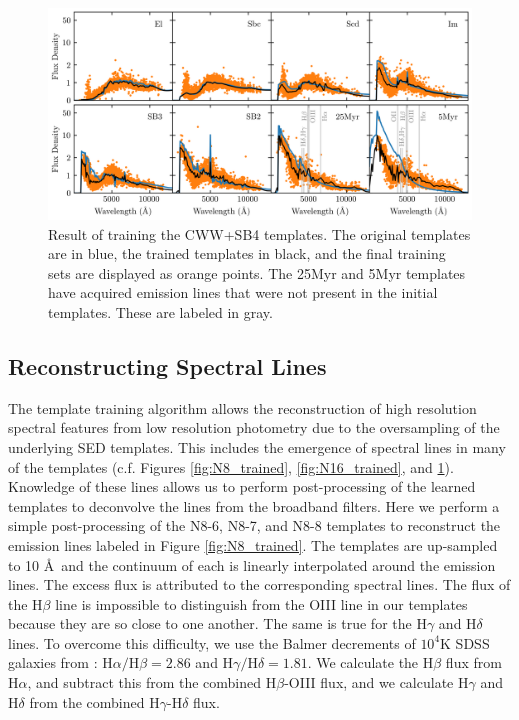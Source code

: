 \begin{figure}
    \centering
    \includegraphics{figures/cwwsb4_trained.png}
    \caption{Result of training the CWW+SB4 templates. The original templates are in blue, the trained templates in black, and the final training sets are displayed as orange points. The 25Myr and 5Myr templates have acquired emission lines that were not present in the initial templates. These are labeled in gray.}
    \label{fig:cwwsb4_trained}
\end{figure}



\subsection{Reconstructing Spectral Lines}
\label{sect:speclines}

The template training algorithm allows the reconstruction of high resolution spectral features from low resolution photometry due to the oversampling of the underlying SED templates.
This includes the emergence of spectral lines in many of the templates (c.f. Figures \ref{fig:N8_trained}, \ref{fig:N16_trained}, and \ref{fig:cwwsb4_trained}).
Knowledge of these lines allows us to perform post-processing of the learned templates to deconvolve the lines from the broadband filters.
Here we perform a simple post-processing of the N8-6, N8-7, and N8-8 templates to reconstruct the emission lines labeled in Figure \ref{fig:N8_trained}.
The templates are up-sampled to 10 \AA\ and the continuum of each is linearly interpolated around the emission lines.
The excess flux is attributed to the corresponding spectral lines. 
The flux of the H$\beta$ line is impossible to distinguish from the OIII line in our templates because they are so close to one another.
The same is true for the H$\gamma$ and H$\delta$ lines.
To overcome this difficulty, we use the Balmer decrements of $10^4$K SDSS galaxies from \citet{Groves2012a}: H$\alpha/$H$\beta = 2.86$ and H$\gamma/$H$\delta = 1.81$.
We calculate the H$\beta$ flux from H$\alpha$, and subtract this from the combined H$\beta$-OIII flux, and we calculate H$\gamma$ and H$\delta$ from the combined H$\gamma$-H$\delta$ flux.

